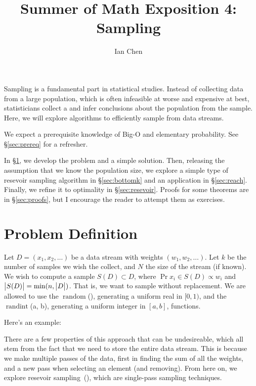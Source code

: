 \documentclass{article}
\title{Summer of Math Exposition 4: Sampling}
\author{Ian Chen}
\newcommand{\random}{\ensuremath{\mathop{random}}}
\newcommand{\randint}{\ensuremath{\mathop{randint}}}
\begin{document}
\maketitle

Sampling is a fundamental part in statistical studies.
Instead of collecting data from a large population, which is often infeasible at worse and expensive at best, statisticians collect a  and infer conclusions about the population from the sample.
Here, we will explore algorithms to efficiently sample from data streams.

We expect a prerequisite knowledge of Big-O and elementary probability.
See \S\ref{sec:prereq} for a refresher.

In \S\ref{sec:problem}, we develop the problem and a simple solution.
Then, releasing the assumption that we know the population size, we explore a simple type of resevoir sampling algorithm in \S\ref{sec:bottomk} and an application in \S\ref{sec:reach}.
Finally, we refine it to optimality in \S\ref{sec:resevoir}.
Proofs for some theorems are in \S\ref{sec:proofs}, but I encourage the reader to attempt them as exercises.

\section{Problem Definition}
\label{sec:problem}

Let $D = (x_1, x_2, \ldots)$ be a data stream with weights $(w_1, w_2, \ldots)$.
Let $k$ be the number of samples we wish the collect, and $N$ the size of the stream (if known).
We wish to compute a sample $S(D) \subset D$, where $\Pr{x_i \in S(D)} \propto w_i$ and $\left| \bigr. S(D) \right| = \min(n, \left| \bigr. D \right|)$.
That is, we want to sample without replacement.
We are allowed to use the \random(), generating a uniform real in $[0, 1)$, and the \randint(a, b), generating a uniform integer in $[a, b]$, functions.

Here's an example:

There are a few properties of this approach that can be undesireable, which all stem from the fact that we need to store the entire data stream.
This is because we make multiple passes of the data, first in finding the sum of all the weights, and a new pass when selecting an element (and removing).
From here on, we explore resevoir sampling~(\cite{vitter85-03}), which are single-pass sampling techniques.
\end{document}
